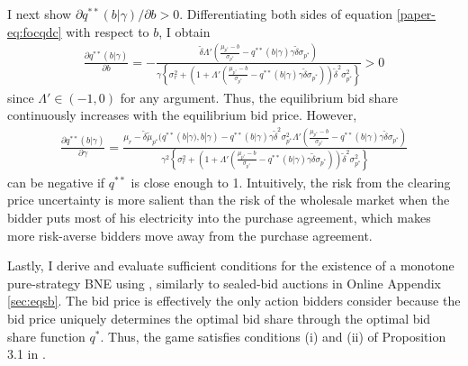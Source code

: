 \documentclass[12pt]{article}
\theoremstyle{definition} %
\begin{document}
I next show $\partial q^{\ast\ast}(b|\gamma)/\partial b > 0 $. Differentiating both sides of equation \eqref{paper-eq:focqdc} with respect to $b $, I obtain
\begin{align*}
\frac{\partial q^{\ast\ast}(b|\gamma)}{\partial b} = - \frac{\tilde{\delta} \Lambda'\left(\frac{\mu_{p^\ast} - b}{\sigma_{p^\ast}} - q^{\ast\ast}(b|\gamma) \gamma \tilde{\delta} \sigma_{p^\ast} \right)}{\gamma \left\{ \sigma_r^2 + \left(1+\Lambda'\left(\frac{\mu_{p^\ast} - b}{\sigma_{p^\ast}} - q^{\ast\ast}(b|\gamma) \gamma \tilde{\delta} \sigma_{p^\ast} \right)\right) \tilde{\delta}^2 \sigma_{p^\ast}^2 \right\} } > 0
\end{align*}
since $\Lambda' \in (-1,0) $ for any argument. Thus, the equilibrium bid share continuously increases with the equilibrium bid price. However,
\begin{align*}
\frac{\partial q^{\ast\ast}(b|\gamma)}{\partial \gamma} = \frac{\mu_r - \tilde{\delta} \tilde{\mu}_{p^\ast}(q^{\ast\ast}(b|\gamma),b|\gamma) - q^{\ast\ast}(b|\gamma) \gamma \tilde{\delta}^2 \sigma_{p^\ast}^2 \Lambda'\left(\frac{\mu_{p^\ast} - b}{\sigma_{p^\ast}} - q^{\ast\ast}(b|\gamma) \gamma \tilde{\delta} \sigma_{p^\ast} \right)}{\gamma^2 \left\{ \sigma_r^2 + \left(1+\Lambda'\left(\frac{\mu_{p^\ast} - b}{\sigma_{p^\ast}} - q^{\ast\ast}(b|\gamma) \gamma \tilde{\delta} \sigma_{p^\ast} \right)\right) \tilde{\delta}^2 \sigma_{p^\ast}^2 \right\} }
\end{align*}
can be negative if $q^{\ast\ast} $ is close enough to 1. Intuitively, the risk from the clearing price uncertainty is more salient than the risk of the wholesale market when the bidder puts most of his electricity into the purchase agreement, which makes more risk-averse bidders move away from the purchase agreement.

Lastly, I derive and evaluate sufficient conditions for the existence of a monotone pure-strategy BNE using \citet{Reny2011}, similarly to sealed-bid auctions in Online Appendix \ref{sec:eqsb}. The bid price is effectively the only action bidders consider because the bid price uniquely determines the optimal bid share through the optimal bid share function $q^\ast $. Thus, the game satisfies conditions (i) and (ii) of Proposition 3.1 in \citet{Reny2011}.
\end{document}
